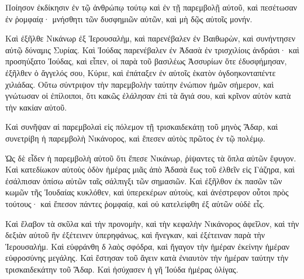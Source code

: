{Ποίησον ἐκδίκησιν ἐν τῷ ἀνθρώπῳ τούτῳ καὶ ἐν τῇ παρεμβολῇ αὐτοῦ, καὶ πεσέτωσαν ἐν ῥομφαίᾳ· μνήσθητι τῶν δυσφημιῶν αὐτῶν, καὶ μὴ δῷς αὐτοῖς μονήν.
\par }{\PP {}Καὶ ἐξῆλθε Νικάνωρ ἐξ Ἱερουσαλὴμ, καὶ παρενέβαλεν ἐν Βαιθωρὼν, καὶ συνήντησεν αὐτῷ δύναμις Συρίας.
Καὶ Ἰούδας παρενέβαλεν ἐν Ἀδασὰ ἐν τρισχιλίοις ἀνδράσι· καὶ προσηύξατο Ἰούδας, καὶ εἶπεν,
οἱ παρὰ τοῦ βασιλέως Ἀσσυρίων ὅτε ἐδυσφήμησαν, ἐξῆλθεν ὁ ἄγγελός σου, Κύριε, καὶ ἐπάταξεν ἐν αὐτοῖς ἑκατὸν ὀγδοηκονταπέντε χιλιάδας.
Οὕτω σύντριψον τὴν παρεμβολὴν ταύτην ἐνώπιον ἡμῶν σήμερον, καὶ γνώτωσαν οἱ ἐπίλοιποι, ὅτι κακῶς ἐλάλησαν ἐπὶ τὰ ἅγιά σου, καὶ κρῖνον αὐτὸν κατὰ τὴν κακίαν αὐτοῦ.
\par }{\PP {}Καὶ συνῆψαν αἱ παρεμβολαὶ εἰς πόλεμον τῇ τρισκαιδεκάτῃ τοῦ μηνὸς Ἄδαρ, καὶ συνετρίβη ἡ παρεμβολὴ Νικάνορος, καὶ ἔπεσεν αὐτὸς πρῶτος ἐν τῷ πολέμῳ.
\par }{\PP {}Ὡς δὲ εἶδεν ἡ παρεμβολὴ αὐτοῦ ὅτι ἔπεσε Νικάνωρ, ῥίψαντες τὰ ὅπλα αὐτῶν ἔφυγον.
Καὶ κατεδίωκον αὐτοὺς ὁδὸν ἡμέρας μιᾶς ἀπὸ Ἀδασὰ ἕως τοῦ ἐλθεῖν εἰς Γάζηρα, καὶ ἐσάλπισαν ὀπίσω αὐτῶν ταῖς σάλπιγξι τῶν σημασιῶν.
Καὶ ἐξῆλθον ἐκ πασῶν τῶν κωμῶν τῆς Ἰουδαίας κυκλόθεν, καὶ ὑπερεκέρων αὐτοὺς, καὶ ἀνέστρεφον οὗτοι πρὸς τούτους· καὶ ἔπεσον πάντες ῥομφαίᾳ, καὶ οὐ κατελείφθη ἐξ αὐτῶν οὐδὲ εἷς.
\par }{\PP {}Καὶ ἔλαβον τὰ σκῦλα καὶ τὴν προνομὴν, καὶ τὴν κεφαλὴν Νικάνορος ἀφεῖλον, καὶ τὴν δεξιὰν αὐτοῦ ἣν ἐξέτεινεν ὑπερηφάνως, καὶ ἤνεγκαν, καὶ ἐξέτειναν παρὰ τὴν Ἱερουσαλήμ.
Καὶ εὐφράνθη δ λαὸς σφόδρα, καὶ ἤγαγον τὴν ἡμέραν ἐκείνην ἡμέραν εὐφροσύνης μεγάλης.
Καὶ ἔστησαν τοῦ ἄγειν κατὰ ἐνιαυτὸν τὴν ἡμέραν ταύτην τὴν τρισκαιδεκάτην τοῦ Ἄδαρ.
Καὶ ἡσύχασεν ἡ γῆ Ἰούδα ἡμέρας ὀλίγας.

}
